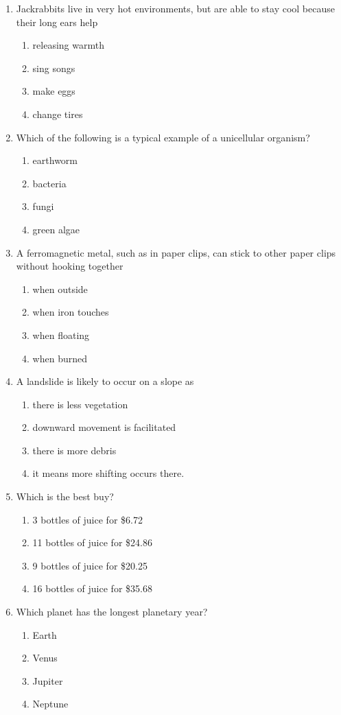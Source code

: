 \documentclass[12pt]{article}
\begin{document}
\begin{enumerate}[label=\arabic*.]
\begin{enumerate}[label=(\alph*)]
    \item 3
    \item 2
\end{enumerate}
\item Jackrabbits live in very hot environments, but are able to stay cool because their long ears help
\begin{enumerate}[label=(\alph*)]
    \item releasing warmth
    \item sing songs
    \item make eggs
    \item change tires
\end{enumerate}
\item Which of the following is a typical example of a unicellular organism?
\begin{enumerate}[label=(\alph*)]
    \item earthworm
    \item bacteria
    \item fungi
    \item green algae
\end{enumerate}
\item A ferromagnetic metal, such as in paper clips, can stick to other paper clips without hooking together
\begin{enumerate}[label=(\alph*)]
    \item when outside
    \item when iron touches
    \item when floating
    \item when burned
\end{enumerate}
\item A landslide is likely to occur on a slope as
\begin{enumerate}[label=(\alph*)]
    \item there is less vegetation
    \item downward movement is facilitated
    \item there is more debris
    \item it means more shifting occurs there.
\end{enumerate}
\item Which is the best buy?
\begin{enumerate}[label=(\alph*)]
    \item 3 bottles of juice for \$6.72
    \item 11 bottles of juice for \$24.86
    \item 9 bottles of juice for \$20.25
    \item 16 bottles of juice for \$35.68
\end{enumerate}
\item Which planet has the longest planetary year?
\begin{enumerate}[label=(\alph*)]
    \item Earth
    \item Venus
    \item Jupiter
    \item Neptune
\end{enumerate}
\end{enumerate}
\end{document}
